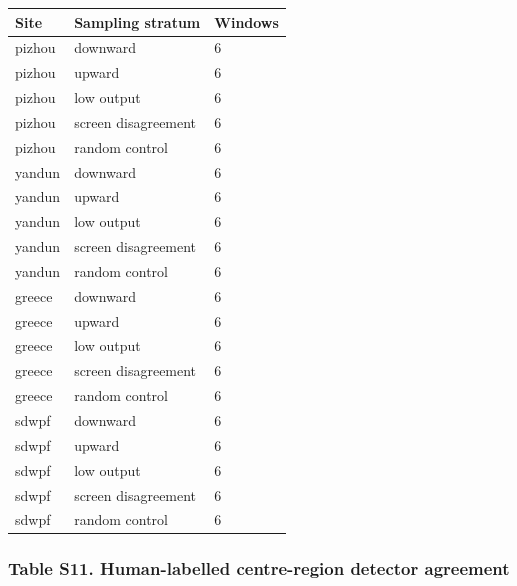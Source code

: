 \documentclass[a4paper,11pt]{article}
\newcounter{none}
\begin{document}
{\def\LTcaptype{none} %
\begin{longtable}[]{@{}lll@{}}
\toprule\noalign{}
Site & Sampling stratum & Windows \\
\midrule\noalign{}
\endhead
\bottomrule\noalign{}
\endlastfoot
pizhou & downward & 6 \\
pizhou & upward & 6 \\
pizhou & low output & 6 \\
pizhou & screen disagreement & 6 \\
pizhou & random control & 6 \\
yandun & downward & 6 \\
yandun & upward & 6 \\
yandun & low output & 6 \\
yandun & screen disagreement & 6 \\
yandun & random control & 6 \\
greece & downward & 6 \\
greece & upward & 6 \\
greece & low output & 6 \\
greece & screen disagreement & 6 \\
greece & random control & 6 \\
sdwpf & downward & 6 \\
sdwpf & upward & 6 \\
sdwpf & low output & 6 \\
sdwpf & screen disagreement & 6 \\
sdwpf & random control & 6 \\
\end{longtable}
}

\subsubsection{Table S11. Human-labelled centre-region detector agreement}\label{table-s11.-human-labelled-centre-region-detector-agreement}
\end{document}
